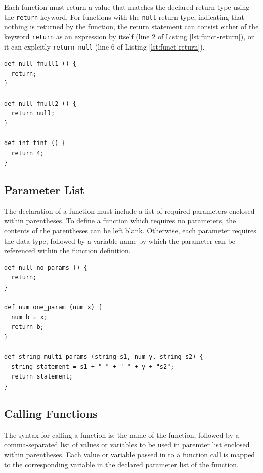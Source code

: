 \documentclass{article}
\newcommand{\code}[1]{\texttt{#1}} %
\begin{document}
Each function must return a value that matches the declared return type using the \code{return} keyword. For functions with the \code{null} return type, indicating that nothing is returned by the function, the return statement can consist either of the keyword \code{return} as an expression by itself (line 2 of Listing \ref{lst:funct-return}), or it can explcitly \code{return null} (line 6 of Listing \ref{lst:funct-return}).

\begin{lstlisting}[language=pltLang, caption=Return statements of functions., label=lst:funct-return]
def null fnull1 () {
  return;
}

def null fnull2 () {
  return null;
}

def int fint () {
  return 4;
}
\end{lstlisting}

\subsection{Parameter List}

The declaration of a function must include a list of required parameters enclosed within parentheses. To define a function which requires no parameters, the contents of the parentheses can be left blank. Otherwise, each parameter requires the data type, followed by a variable name by which the parameter can be referenced within the function definition. 

\begin{lstlisting}[language=pltLang, caption=Parameters in function declarations., label=lst:funct-params]
def null no_params () {
  return;
}

def num one_param (num x) {
  num b = x;
  return b;
}

def string multi_params (string s1, num y, string s2) {
  string statement = s1 + " " + " " + y + "s2";
  return statement;
}

\end{lstlisting}

\subsection{Calling Functions}

The syntax for calling a function is: the name of the function, followed by a comma-separated list of values or variables to be used in paremter list enclosed within parentheses. Each value or variable passed in to a function call is mapped to the corresponding variable in the declared parameter list of the function.
\end{document}
